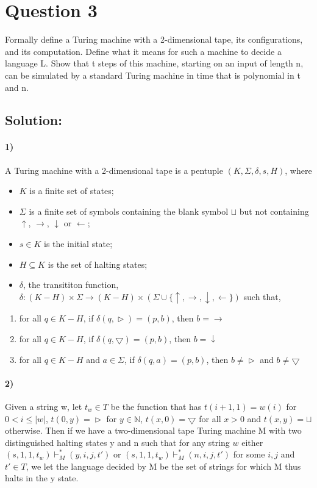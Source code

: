 \documentclass[12pt]{article}
\begin{document}
\section*{Question 3}
Formally define a Turing machine with a 2-dimensional tape, its configurations, and its computation.
Define what it means for such a machine to decide a language L. Show that t steps of this machine,
starting on an input of length n, can be simulated by a standard Turing machine in time that is
polynomial in t and n.
\subsection*{Solution:}
\paragraph{1)} A Turing machine with a 2-dimensional tape is a pentuple $(K, \Sigma, \delta, s, H)$, where

\begin{itemize}
    \item $K$ is a finite set of states;
    \item $\Sigma$ is a finite set of symbols containing the blank symbol $\sqcup$ but not containing $\uparrow$, $\rightarrow$, $\downarrow$ or $\leftarrow$;
    \item $s\in K$ is the initial state;
    \item $H \subseteq K$ is the set of halting states;
    \item $\delta$, the transititon function, $\delta: (K - H) \times  \Sigma \to (K - H) \times (\Sigma \cup \{\uparrow, \rightarrow, \downarrow, \leftarrow\})$ such that,
\end{itemize}
\begin{enumerate}[label=(\alph*)]
    \item for all $q \in K-H$, if $\delta(q, \vartriangleright) = (p, b)$, then $b = \rightarrow$
    \item for all $q \in K-H$, if $\delta(q, \bigtriangledown) = (p, b)$, then $b = \downarrow$
    \item for all $q \in K-H$ and $a \in \Sigma$, if $\delta(q, a) = (p, b)$, then $b \neq \vartriangleright$ and $b \neq \bigtriangledown$
\end{enumerate}


\paragraph{2)} Given a string w, let $t_w\in T$ be the function that has $t(i+1, 1) = w(i)$ for $0 < i \leq |w|$, $t(0, y) = \vartriangleright$ for $y\in \mathbb{N} $, $t(x, 0) = \bigtriangledown$ for all $x > 0$ and $t(x, y) = \sqcup$ otherwise. Then if we have a two-dimensional tape Turing machine M with two distinguished halting states y and n such that for any string $w$ either $(s, 1, 1, t_w) \vdash^*_M (y, i, j, t')$ or $(s, 1, 1, t_w) \vdash^*_M (n, i, j, t')$ for some $i, j$ and $t'\in T$, we let the language decided by M be the set of strings for which M thus halts in the y state.
\end{document}

